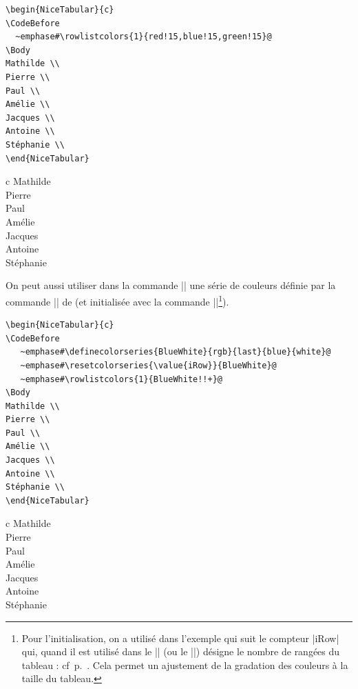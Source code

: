 \documentclass[dvipsnames]{article}%
\begin{document}
\begin{itemize}
\smallskip
\begin{BVerbatim}[boxwidth=10cm,baseline=c]
\begin{NiceTabular}{c}
\CodeBefore
  ~emphase#\rowlistcolors{1}{red!15,blue!15,green!15}@
\Body
Mathilde \\
Pierre \\
Paul \\
Amélie \\
Jacques \\
Antoine \\
Stéphanie \\
\end{NiceTabular}
\end{BVerbatim}
\begin{NiceTabular}{c}
\CodeBefore
\Body
Mathilde \\
Pierre \\
Paul \\
Amélie \\
Jacques \\
Antoine \\
Stéphanie \\
\end{NiceTabular}

\bigskip
On peut aussi utiliser dans la commande |\rowlistcolors| une série de couleurs
définie par la commande || de  (et initialisée
avec la commande |\resetcolorseries|\footnote{Pour l'initialisation, on a
  utilisé dans l'exemple qui suit le compteur |iRow| qui, quand il est utilisé
  dans le |\CodeBefore| (ou le |\CodeAfter|) désigne le nombre de rangées du
  tableau : cf~p.~\pageref{iRow}. Cela permet un ajustement de la gradation des
  couleurs à la taille du tableau.}).

\smallskip
\begin{BVerbatim}[boxwidth=12cm,baseline=c]
\begin{NiceTabular}{c}
\CodeBefore
   ~emphase#\definecolorseries{BlueWhite}{rgb}{last}{blue}{white}@
   ~emphase#\resetcolorseries{\value{iRow}}{BlueWhite}@
   ~emphase#\rowlistcolors{1}{BlueWhite!!+}@
\Body
Mathilde \\
Pierre \\
Paul \\
Amélie \\
Jacques \\
Antoine \\
Stéphanie \\
\end{NiceTabular}
\end{BVerbatim}
\begin{NiceTabular}{c}
\CodeBefore
   \resetcolorseries[\value{iRow}]{BlueWhite}
\Body
Mathilde \\
Pierre \\
Paul \\
Amélie \\
Jacques \\
Antoine \\
Stéphanie \\
\end{NiceTabular}


\end{itemize}
\end{document}
